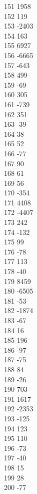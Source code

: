 { 151	1958 \\
 152	119 \\
 153	-2403 \\
 154	163 \\
 155	6927 \\
 156	-6665 \\
 157	-643 \\
 158	499 \\
 159	-69 \\
 160	305 \\
 161	-739 \\
 162	351 \\
 163	-39 \\
 164	38 \\
 165	52 \\
 166	-77 \\
 167	90 \\
 168	61 \\
 169	56 \\
 170	-354 \\
 171	4408 \\
 172	-4407 \\
 173	242 \\
 174	-132 \\
 175	99 \\
 176	-78 \\
 177	113 \\
 178	-40 \\
 179	8459 \\
 180	-6505 \\
 181	-53 \\
 182	-1874 \\
 183	-67 \\
 184	16 \\
 185	196 \\
 186	-97 \\
 187	-75 \\
 188	84 \\
 189	-26 \\
 190	703 \\
 191	1617 \\
 192	-2353 \\
 193	-125 \\
 194	123 \\
 195	110 \\
 196	-73 \\
 197	-40 \\
 198	15 \\
 199	28 \\
 200	-77 \\
}
